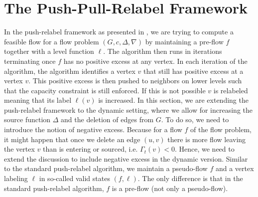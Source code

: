 \documentclass[11pt]{article}
\newcommand\bell{\boldsymbol{\mathit{\ell}}}
\newcommand\cc{\boldsymbol{\mathit{c}}}
\newcommand\ff{\boldsymbol{\mathit{f}}}
\begin{document}
\begin{comment}
    \[O\left(\sum_{i \leq k} \sum_{v \in V}(\text{ab}_{f_i}(v) + \text{ab}_{g_i}(v) + \Delta_i(v)) \cdot (\ell_{i+1}(v) - \ell_i(v)) \right).\]
    We remark that for any vertex $v: \Delta_i(v), \text{ab}_{f_i}(v), \text{ab}_{g_i}(v)$ are increasing in $i$. Thus, the run-time is bounded by
    \[O\left(\sum_{v \in V}\left((\text{ab}_{f_k}(v) + \text{ab}_{g_k}(v) + \Delta_k(v)) \cdot \sum_{i \leq k} (\ell_{i+1}(v) - \ell_i(v)) \right)\right) = O\left(h \cdot \sum_{v \in V}(\text{ab}_{f_k}(v) + \text{ab}_{g_k}(v) + \Delta_k(v))\right).\]
    Moreover, we remark that
    \[\sum_{v \in V}(\text{ab}_{f_k}(v) + \text{ab}_{g_k}(v)) = O\left(\sum_{v \in V} \Delta_k(v)\right).\]
    Hence, the run-time is bounded by $O(h \cdot \sum_{v \in V} \Delta_k(v)).$ We note that the total source capacity is bounded by
    \begin{align}
        \sum_{v \in V} \Delta_k(v) &= O\left(\frac{4}{\psi} \cdot \text{cong}(\Pi) \cdot (vol_G(P_k \cup Q_k) + |D|)\right) \\
        &= O\left(\frac{|D|}{\phi^2}\right),
    \end{align}
    which yields the bound on the run-time.
\end{proof}

\subsection{Dynamic Expander Decomposition}

\end{comment}

\section{The Push-Pull-Relabel Framework}
\label{sec:pushpullRelabel}

In the push-relabel framework as presented in \cite{goldberg1988new}, we are trying to compute a feasible flow for a flow problem $(G, \cc, \Delta, \nabla)$ by maintaining a pre-flow $\ff$ together with a level function $\bell$. The algorithm then runs in iterations terminating once $\ff$ has no positive excess at any vertex. In each iteration of the algorithm, the algorithm identifies a vertex $v$ that still has positive excess at a vertex $v$. This positive excess is then pushed to neighbors on lower levels such that the capacity constraint is still enforced. If this is not possible $v$ is relabeled meaning that its label $\bell(v)$ is increased. In this section, we are extending the push-relabel framework to the dynamic setting, where we allow for increasing the source function $\Delta$ and the deletion of edges from $G$. To do so, we need to introduce the notion of negative excess. Because for a flow $\ff$ of the flow problem, it might happen that once we delete an edge $(u,v)$ there is more flow leaving the vertex $v$ than is entering or sourced, i.e. $\Gamma_t(v) < 0$. Hence, we need to extend the discussion to include negative excess in the dynamic version. Similar to the standard push-relabel algorithm, we maintain a pseudo-flow $\ff$ and a vertex labeling $\bell$ in so-called valid states $(\ff, \bell)$. The only difference is that in the standard push-relabel algorithm, $\ff$ is a pre-flow (not only a pseudo-flow). 
\end{document}
